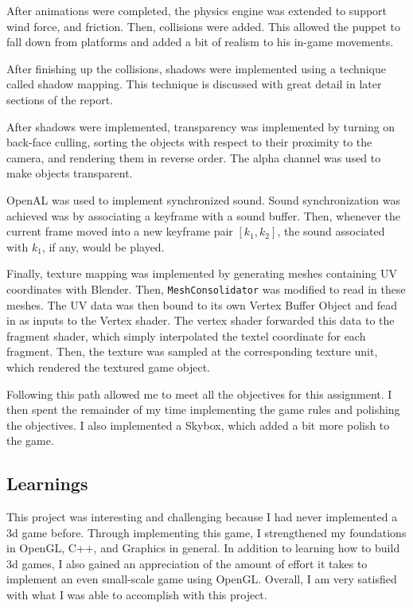 \documentclass[11pt]{report}
\begin{document}
After animations were completed, the physics engine was extended to support wind force, and friction. Then, collisions were added. This allowed the puppet to fall down from platforms and added a bit of realism to his in-game movements.

After finishing up the collisions, shadows were implemented using a technique called shadow mapping. This technique is discussed with great detail in later sections of the report.

After shadows were implemented, transparency was implemented by turning on back-face culling, sorting the objects with respect to their proximity to the camera, and rendering them in reverse order. The alpha channel was used to make objects transparent.

OpenAL was used to implement synchronized sound. Sound synchronization was achieved was by associating a keyframe with a sound buffer. Then, whenever the current frame moved into a new keyframe pair $[k_1, k_2]$, the sound associated with $k_1$, if any, would be played.

Finally, texture mapping was implemented by generating meshes containing UV coordinates with Blender. Then, \verb|MeshConsolidator| was modified to read in these meshes. The UV data was then bound to its own Vertex Buffer Object and fead in as inputs to the Vertex shader. The vertex shader forwarded this data to the fragment shader, which simply interpolated the textel coordinate for each fragment. Then, the texture was sampled at the corresponding texture unit, which rendered the textured game object.

Following this path allowed me to meet all the objectives for this assignment. I then spent the remainder of my time implementing the game rules and polishing the objectives. I also implemented a Skybox, which added a bit more polish to the game.

\subsection{Learnings}
This project was interesting and challenging because I had never implemented a 3d game before. Through implementing this game, I strengthened my foundations in OpenGL, C++, and Graphics in general. In addition to learning how to build 3d games, I also gained an appreciation of the amount of effort it takes to implement an even small-scale game using OpenGL. Overall, I am very satisfied with what I was able to accomplish with this project.
\end{document}
